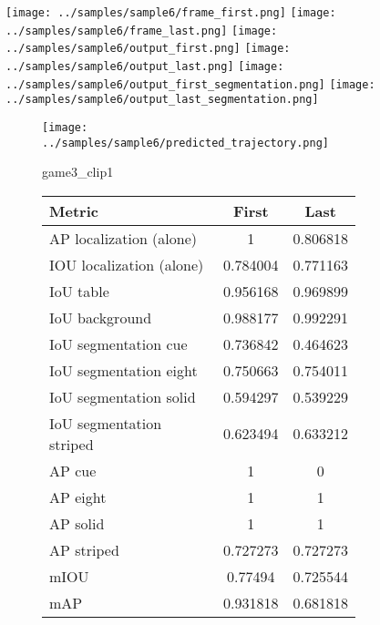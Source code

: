 \begin{figure}
    \texttt{[image: ../samples/sample6/frame\_first.png]}
    \texttt{[image: ../samples/sample6/frame\_last.png]}
    \newline
    \texttt{[image: ../samples/sample6/output\_first.png]}
    \texttt{[image: ../samples/sample6/output\_last.png]}
    \newline
    \texttt{[image: ../samples/sample6/output\_first\_segmentation.png]}
    \texttt{[image: ../samples/sample6/output\_last\_segmentation.png]}
    \newline
    \begin{subfigure}[b]{0.49\textwidth}
        \vspace{20pt}
        \texttt{[image: ../samples/sample6/predicted\_trajectory.png]}
        \caption*{game3\_clip1}
    \end{subfigure}
\begin{subfigure}[b]{0.49\textwidth}
    \begin{tabular}{|l|c|c|}
        \hline
        \textbf{Metric} & \textbf{First} & \textbf{Last} \\
        \hline
        AP localization (alone) & 1 & 0.806818 \\ 
        IOU localization (alone) & 0.784004 & 0.771163 \\ 
        \hline
        IoU table & 0.956168 & 0.969899 \\ 
        IoU background & 0.988177 & 0.992291 \\ 
        \hline
        IoU segmentation cue & 0.736842 & 0.464623 \\ 
        IoU segmentation eight & 0.750663 & 0.754011 \\ 
        IoU segmentation solid & 0.594297 & 0.539229 \\ 
        IoU segmentation striped & 0.623494 & 0.633212 \\ 
        \hline
        AP cue & 1 & 0 \\ 
        AP eight & 1 & 1 \\ 
        AP solid & 1 & 1 \\ 
        AP striped & 0.727273 & 0.727273 \\ 
        \hline
        mIOU & 0.77494 & 0.725544 \\ 
        mAP & 0.931818 & 0.681818 \\ 
        \hline
    \end{tabular}    
\end{subfigure}
\end{figure}

